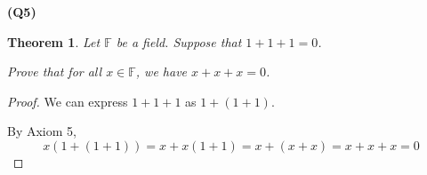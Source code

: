 \documentclass[12pt, a4paper]{article}
\newcommand{\F}{\mathbb{F}}
\newtheorem{theorem}{Theorem}
\begin{document}
\noindent\textbf{(Q5)}

\begin{theorem}
    Let $\F$ be a field. Suppose that $1 + 1 + 1 = 0$.

    Prove that for all $x \in \F$, we have $x + x + x = 0$.
\end{theorem}

\begin{proof}
    
    We can express $1 + 1 + 1$ as $1 + (1 + 1)$.

    By Axiom 5, 
    \[
        x(1 + (1 + 1)) = x + x(1 + 1) = x + (x + x) = x + x + x = 0
    \]
\end{proof}
\end{document}
